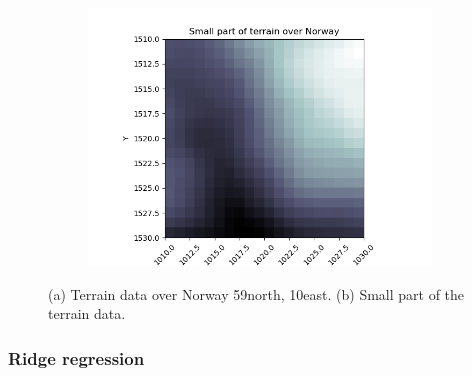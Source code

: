 \documentclass[../main.tex]{subfiles}
\begin{document}
\begin{figure}[htb]
   \quad
   \begin{subfigure}[b]{0.45\textwidth}
    \centering
    \includegraphics[width=\textwidth]{../assets/part_of_terrain.png} 
    \caption{}
   \end{subfigure}
   \caption{(a) Terrain data over Norway 59\degree north, 10\degree east. (b) Small part of the terrain data.}
\end{figure} 

\subsubsection{Ridge regression}
\end{document}
